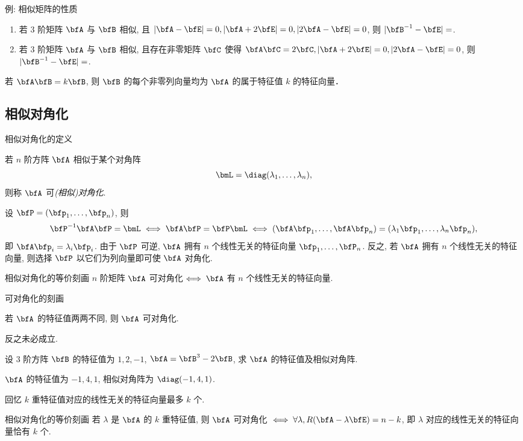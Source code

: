 \begin{frame}{例: 相似矩阵的性质}
	\onslide<+->
	\begin{exercise}
		\begin{enumerate}
			\item 若 $3$ 阶矩阵 $\bfA$ 与 $\bfB$ 相似, 且 $|\bfA-\bfE|=0, |\bfA+2\bfE|=0, |2\bfA-\bfE|=0$, 则 $|\bfB^{-1}-\bfE|=$.
			\item 若 $3$ 阶矩阵 $\bfA$ 与 $\bfB$ 相似, 且存在非零矩阵 $\bfC$ 使得 $\bfA\bfC=2\bfC, |\bfA+2\bfE|=0, |2\bfA-\bfE|=0$, 则 $|\bfB^{-1}-\bfE|=$.
		\end{enumerate}
	\end{exercise}
	\onslide<+->
	若 $\bfA\bfB=k\bfB$, 则 $\bfB$ 的每个非零列向量均为 $\bfA$ 的属于特征值 $k$ 的特征向量．
\end{frame}


\subsection{相似对角化}
\begin{frame}{相似对角化的定义}
	\onslide<+->
	\begin{definition}
		若 $n$ 阶方阵 $\bfA$ 相似于某个对角阵
		\[\bmL=\diag(\lambda_1,\dots,\lambda_n),\]
		则称 $\bfA$ 可\emph{(相似)对角化}.
	\end{definition}
	\onslide<+->
	设 $\bfP=(\bfp_1,\dots,\bfp_n)$, 则
	\[\bfP^{-1}\bfA\bfP=\bmL\iff
	\bfA\bfP=\bfP\bmL\iff
	(\bfA\bfp_1,\dots,\bfA\bfp_n)
	=(\lambda_1\bfp_1,\dots,\lambda_n\bfp_n),\]
	\onslide<+->
	即 $\bfA\bfp_i=\lambda_i\bfp_i$.
	\onslide<+->
	由于 $\bfP$ 可逆, $\bfA$ 拥有 $n$ 个线性无关的特征向量 $\bfp_1,\dots,\bfP_n$.
	\onslide<+->
	反之, 若 $\bfA$ 拥有 $n$ 个线性无关的特征向量, 则选择 $\bfP$ 以它们为列向量即可使 $\bfA$ 对角化.
	\onslide<+->
	\begin{second}{相似对角化的等价刻画}
		$n$ 阶矩阵 $\bfA$ 可对角化$\iff\bfA$ 有 $n$ 个线性无关的特征向量.
	\end{second}
\end{frame}


\begin{frame}{可对角化的刻画}
	\onslide<+->
	\begin{corollary}
		若 $\bfA$ 的特征值两两不同, 则 $\bfA$ 可对角化.
	\end{corollary}
	\onslide<+->
	\alert{反之未必成立}.
	\onslide<+->
	\begin{example}
		设 $3$ 阶方阵 $\bfB$ 的特征值为 $1,2,-1$, $\bfA=\bfB^3-2\bfB$, 求 $\bfA$ 的特征值及相似对角阵.
	\end{example}
	\onslide<+->
	\begin{solution}
		$\bfA$ 的特征值为 $-1,4,1$, 相似对角阵为 $\diag(-1,4,1)$.
	\end{solution}
	\onslide<+->
	回忆 $k$ 重特征值对应的线性无关的特征向量最多 $k$ 个.
	\onslide<+->
	\begin{second}{相似对角化的等价刻画}
		若 $\lambda$ 是 $\bfA$ 的 $k$ 重特征值, 则 $\bfA$ 可对角化 $\iff\forall\lambda, R(\bfA-\lambda\bfE)=n-k$, 即 $\lambda$ 对应的线性无关的特征向量恰有 $k$ 个.
	\end{second}
\end{frame}


